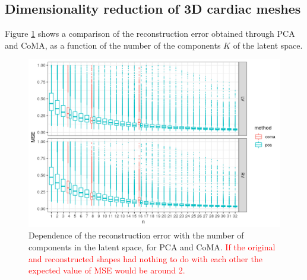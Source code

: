 \documentclass[twocolumn]{llncs}
\begin{document}
\subsection{Dimensionality reduction of 3D cardiac meshes}
Figure \ref{fig:pca_vs_coma} shows a comparison of the reconstruction error obtained through PCA and CoMA, as a function of the number of the components $K$ of the latent space. 

\begin{figure}
\includegraphics[width=\linewidth]{figs/mse_pca_vs_coma.png}
\caption{Dependence of the reconstruction error with the number of components in the latent space, for PCA and CoMA. \textcolor{red}{If the original and reconstructed shapes had nothing to do with each other the expected value of MSE would be around 2.}}
\label{fig:pca_vs_coma}
\end{figure}
\end{document}
